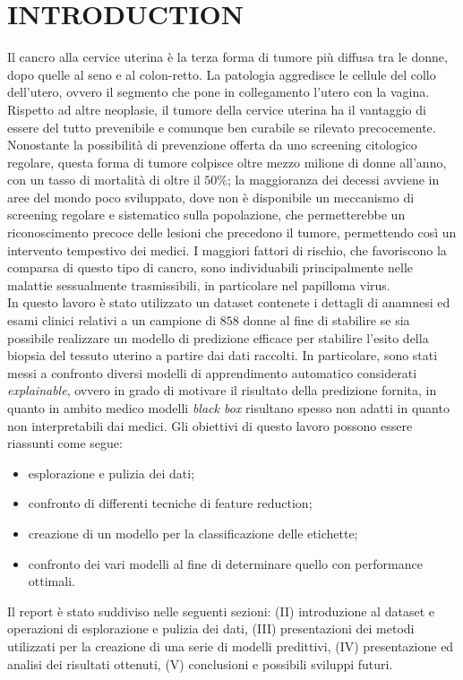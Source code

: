 \section{INTRODUCTION}
Il cancro alla cervice uterina è la terza forma di tumore più diffusa tra le donne, dopo quelle al seno e al colon-retto. La patologia aggredisce le cellule del collo dell’utero, ovvero il segmento che pone in collegamento l’utero con la vagina. Rispetto ad altre neoplasie, il tumore della cervice uterina ha il vantaggio di essere del tutto prevenibile e comunque ben curabile se rilevato precocemente. \cite{veronesi}
Nonostante la possibilità di prevenzione offerta da uno screening citologico regolare, questa forma di tumore colpisce oltre mezzo milione di donne all'anno, con un tasso di mortalità di oltre il $50\%$; la maggioranza dei decessi avviene in aree del mondo poco sviluppato, dove non è disponibile un meccanismo di screening regolare e sistematico sulla popolazione, che permetterebbe un riconoscimento precoce delle lesioni che precedono il tumore, permettendo così un intervento tempestivo dei medici. \cite{paper}
I maggiori fattori di rischio, che favoriscono la comparsa di questo tipo di cancro, sono individuabili principalmente nelle malattie sessualmente trasmissibili, in particolare nel papilloma virus.\\
In questo lavoro è stato utilizzato un dataset contenete i dettagli di anamnesi ed esami clinici relativi a un campione di $858$ donne al fine di stabilire se sia possibile realizzare un modello di predizione efficace per stabilire l'esito della biopsia del tessuto uterino a partire dai dati raccolti.
In particolare, sono stati messi a confronto diversi modelli di apprendimento automatico considerati \textit{explainable}, ovvero in grado di motivare il risultato della predizione fornita, in quanto in ambito medico modelli \textit{black box} risultano spesso non adatti in quanto non interpretabili dai medici.
Gli obiettivi di questo lavoro possono essere riassunti come segue:
\begin{itemize}
	\item esplorazione e pulizia dei dati;
	\item confronto di differenti tecniche di feature reduction;
	\item creazione di un modello per la classificazione delle etichette;
	\item confronto dei vari modelli al fine di determinare quello con performance ottimali.
\end{itemize}
Il report è stato suddiviso nelle seguenti sezioni: (II) introduzione al dataset e operazioni di esplorazione e pulizia dei dati, (III) presentazioni dei metodi utilizzati per la creazione di una serie di modelli predittivi, (IV) presentazione ed analisi dei risultati ottenuti, (V) conclusioni e possibili sviluppi futuri.